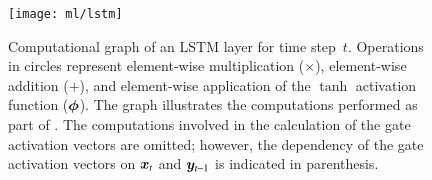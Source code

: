 \begin{figure}[htbp]
  \centering

  \texttt{[image: ml/lstm]}

  \caption[Computational graph of an LSTM layer]{Computational graph of an LSTM
    layer for time step~$t$. Operations in circles represent element-wise
    multiplication ($\times$), element-wise addition ($+$), and element-wise
    application of the $\tanh$ activation function ($\bm{\phi}$). The graph
    illustrates the computations performed as part of
    . The computations involved in the
    calculation of the gate activation vectors are omitted; however, the
    dependency of the gate activation vectors on $\bm{x}_{t}$ and
    $\bm{y}_{t - 1}$ is indicated in parenthesis.}%
  \label{fig:lstm}
\end{figure}



